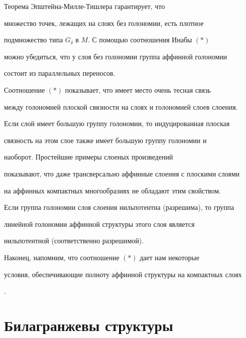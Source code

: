 \begin{pf} Теорема Эпштейна-Милле-Тишлера гарантирует, что


множество точек, лежащих на слоях без голономии, есть плотное


подмножество типа $G_{\delta}$ в $M$. С помощью соотношения Инабы $(*)$


можно убедиться, что у слоя без голономии группа аффинной голономии


состоит из параллельных переносов.


\end{pf}





Соотношение $(*)$ показывает, что имеет место очень тесная связь


между голономией плоской связности на слоях и голономией слоев слоения.


Если слой имеет большую группу голономии, то индуцированная плоская


связность на этом слое также имеет большую группу голономии и


наоборот. Простейшие примеры слоеных произведений


показывают, что даже трансверсально аффинные слоения с плоскими слоями


на аффинных компактных многообразиях не обладают этим свойством.





Если группа голономии слоя слоения нильпотентна (разрешима), то группа


линейной голономии аффинной структуры этого слоя является


нильпотентной (соответственно разрешимой).





Наконец, напомним, что соотношение $(*)$ дает нам некоторые


условия, обеспечивающие полноту аффинной структуры на компактных слоях


\cite{WO1}.





\section{Билагранжевы структуры}





